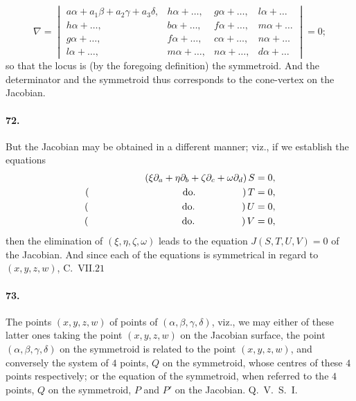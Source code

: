\documentclass[11pt,a4paper]{article}
\begin{document}
\[
\nabla = \begin{vmatrix}
a\alpha + a_1\beta + a_2\gamma + a_3\delta, & h\alpha + \ldots, & g\alpha + \ldots,
& l\alpha + \ldots \\
h\alpha + \ldots, & b\alpha + \ldots, & f\alpha + \ldots, & m\alpha + \ldots \\
g\alpha + \ldots, & f\alpha + \ldots, & c\alpha + \ldots, & n\alpha + \ldots \\
l\alpha + \ldots, & m\alpha + \ldots, & n\alpha + \ldots, & d\alpha + \ldots
\end{vmatrix} = 0;
\]
so that the locus is (by the foregoing definition) the symmetroid. And the
determinator and the symmetroid thus corresponds to the cone-vertex on the
Jacobian.

\medskip

\paragraph{72.}
But the Jacobian may be obtained in a different manner; viz., if we establish the
equations
\begin{align*}
(\xi\partial_a + \eta\partial_b + \zeta\partial_c + \omega\partial_d)\,S &= 0,\\
(\hspace{34mm}\text{do.}\hspace{17mm})\,T &= 0,\\
(\hspace{34mm}\text{do.}\hspace{17mm})\,U &= 0,\\
(\hspace{34mm}\text{do.}\hspace{17mm})\,V &= 0,
\end{align*}
then the elimination of $(\xi, \eta, \zeta, \omega)$ leads to the equation
$J(S, T, U, V) = 0$ of the Jacobian. And since each of the equations is symmetrical
in regard to $(x, y, z, w)$,
\hfill C.\ VII.\quad $21$

\bigskip

\paragraph{73.}
The points $(x, y, z, w)$ of points of $(\alpha, \beta, \gamma, \delta)$, viz., we
may either of these latter ones taking the point $(x, y, z, w)$ on the Jacobian
surface, the point $(\alpha, \beta, \gamma, \delta)$ on the symmetroid is related
to the point $(x, y, z, w)$, and conversely the system of $4$ points, $Q$ on the
symmetroid, whose centres of these $4$ points respectively; or the equation of the
symmetroid, when referred to the $4$ points, $Q$ on the symmetroid, $P$ and $P'$
on the Jacobian. Q.\ V.\ S.\ I.
\end{document}
